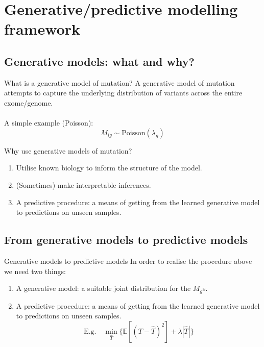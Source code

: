 \documentclass{beamer}
\begin{document}
\section{Generative/predictive modelling framework}
\subsection{Generative models: what and why?}
\begin{frame}{What is a generative model of mutation?}
A generative model of mutation attempts to capture the underlying distribution of variants across the entire exome/genome. \\
~\\
A simple example (Poisson):
\begin{equation}
    M_{ig} \sim \mathrm{Poisson}(\lambda_g)
\end{equation}
\end{frame}

\begin{frame}{Why use generative models of mutation?}

\begin{enumerate}[I]
    \item Utilise known biology to inform the structure of the model.
    \item (Sometimes) make interpretable inferences.
    \item A predictive procedure: a means of getting from the learned generative model to predictions on unseen samples.  
\end{enumerate}

\end{frame}

\subsection{From generative models to predictive models}
\begin{frame}{Generative models to predictive models}
In order to realise the procedure above we need two things:
\begin{enumerate}[I]
    \item A generative model: a suitable joint distribution for the $M_g$s. 
    
    \item A predictive procedure: a means of getting from the learned generative model to predictions on unseen samples.
    \[\mathrm{E.g.} \quad \min_{\hat{T}}\{\mathbb{E}[(T-\hat{T})^2] + \lambda|\hat{T}|\}\]
\end{enumerate}

\end{frame}
\end{document}
